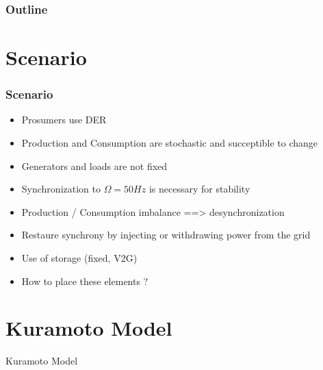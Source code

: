 \documentclass[xcolor=dvipsnames]{beamer}
\begin{document}
\begin{frame}
	\frametitle{Outline}
	\tableofcontents
\end{frame}

\section{Scenario}
\begin{frame}
	\frametitle{Scenario}
	
	\begin{itemize}
		\item Prosumers use DER
		\item Production and Consumption are stochastic and succeptible to change
		\item Generators and loads are not fixed
		\item Synchronization to $ \Omega=50Hz $ is necessary for stability
		\item Production / Consumption imbalance ==> desynchronization
		\item Restaure synchrony by injecting or withdrawing power from the grid
		\item Use of storage (fixed, V2G)
		\item How to place these elements ?
	\end{itemize}
\end{frame}


\section{Kuramoto Model}
\begin{frame}
	\begin{huge}
		\begin{center}
			Kuramoto Model
		\end{center}
	\end{huge}
\end{frame}
\end{document}
